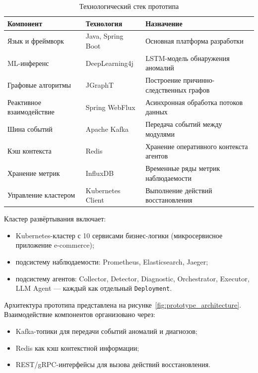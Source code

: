 \begin{table}[H]
\centering
\caption{Технологический стек прототипа}
\label{tab:tech_stack}
\begin{tabular}{|p{3.5cm}|p{3.5cm}|p{7cm}|}
\hline
\textbf{Компонент} & \textbf{Технология} & \textbf{Назначение} \\
\hline
Язык и фреймворк & Java, Spring Boot & Основная платформа разработки \\
\hline
ML-инференс & DeepLearning4j & LSTM-модель обнаружения аномалий \\
\hline
Графовые алгоритмы & JGraphT & Построение причинно-следственных графов \\
\hline
Реактивное взаимодействие & Spring WebFlux & Асинхронная обработка потоков данных \\
\hline
Шина событий & Apache Kafka & Передача событий между модулями \\
\hline
Кэш контекста & Redis & Хранение оперативного контекста агентов \\
\hline
Хранение метрик & InfluxDB & Временные ряды метрик наблюдаемости \\
\hline
Управление кластером & Kubernetes Client & Выполнение действий восстановления \\
\hline
\end{tabular}
\end{table}

Кластер развёртывания включает:
\begin{itemize}
  \item Kubernetes-кластер с 10 сервисами бизнес-логики (микросервисное приложение e-commerce);
  \item подсистему наблюдаемости: Prometheus, Elasticsearch, Jaeger;
  \item подсистему агентов: Collector, Detector, Diagnostic, Orchestrator, Executor, LLM Agent --- каждый как отдельный \texttt{Deployment}.

\end{itemize}

Архитектура прототипа представлена на рисунке~\ref{fig:prototype_architecture}. Взаимодействие компонентов организовано через:
\begin{itemize}
  \item Kafka-топики для передачи событий аномалий и диагнозов;
  \item Redis как кэш контекстной информации;
  \item REST/gRPC-интерфейсы для вызова действий восстановления.

\end{itemize}

